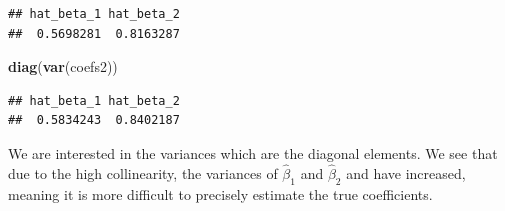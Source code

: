 \documentclass[]{book}
\newenvironment{Shaded}{\begin{snugshade}}{\end{snugshade}}
\newcommand{\CommentTok}[1]{\textcolor[rgb]{0.56,0.35,0.01}{\textit{#1}}}
\newcommand{\DataTypeTok}[1]{\textcolor[rgb]{0.13,0.29,0.53}{#1}}
\newcommand{\DecValTok}[1]{\textcolor[rgb]{0.00,0.00,0.81}{#1}}
\newcommand{\FloatTok}[1]{\textcolor[rgb]{0.00,0.00,0.81}{#1}}
\newcommand{\KeywordTok}[1]{\textcolor[rgb]{0.13,0.29,0.53}{\textbf{#1}}}
\newcommand{\NormalTok}[1]{#1}
\newcommand{\OperatorTok}[1]{\textcolor[rgb]{0.81,0.36,0.00}{\textbf{#1}}}
\newcommand{\StringTok}[1]{\textcolor[rgb]{0.31,0.60,0.02}{#1}}
\begin{document}
\begin{Shaded}
\end{Shaded}

\begin{verbatim}
## hat_beta_1 hat_beta_2 
##  0.5698281  0.8163287
\end{verbatim}

\begin{Shaded}
\begin{Highlighting}[]
\KeywordTok{diag}\NormalTok{(}\KeywordTok{var}\NormalTok{(coefs2))}
\end{Highlighting}
\end{Shaded}

\begin{verbatim}
## hat_beta_1 hat_beta_2 
##  0.5834243  0.8402187
\end{verbatim}

We are interested in the variances which are the diagonal elements. We see that due to the high collinearity, the variances of \(\hat{\beta}_1\) and \(\hat{\beta}_2\) and have increased, meaning it is more difficult to precisely estimate the true coefficients.
\end{document}

